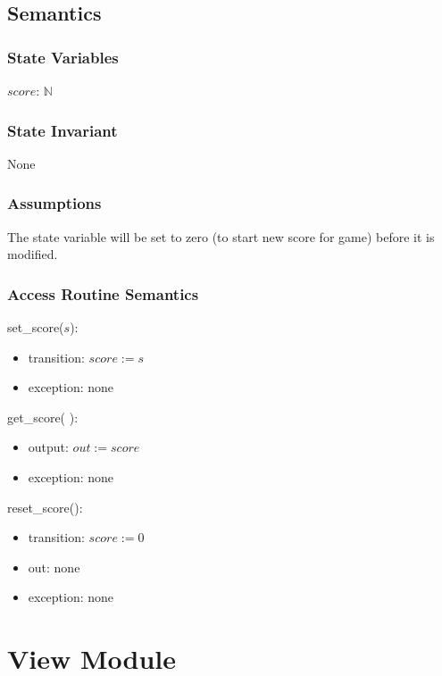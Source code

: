 \documentclass[12pt]{article}
\begin{document}
\subsection* {Semantics}

\subsubsection* {State Variables}

$\mathit{score}$: $\mathbb{N}$

\subsubsection* {State Invariant}

None

\subsubsection* {Assumptions}

The state variable will be set to zero (to start new score for game) before it is modified. 

\subsubsection* {Access Routine Semantics}

\noindent set\_score($\mathit{s}$):
\begin{itemize}
\item transition: $\mathit{score} := \mathit{s}$
\item exception: none
\end{itemize}

\noindent get\_score( ):
\begin{itemize}
\item output: $out := \mathit{score}$
\item exception: none
\end{itemize}

\noindent reset\_score():
\begin{itemize}
\item transition: $\mathit{score} := 0$
\item out: none
\item exception: none
\end{itemize}

\newpage

\section* {View Module}
\end{document}
